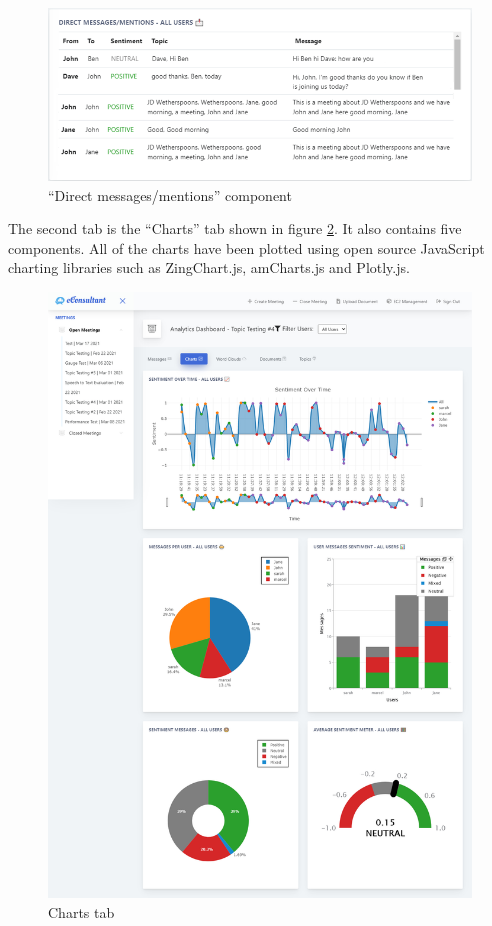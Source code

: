 \documentclass{article}
\begin{document}
\begin{figure}[H]
  \centering
  \includegraphics[scale=0.7]{charts/mentions.png}
  \caption{``Direct messages/mentions'' component}
  \label{fig:mentions}
\end{figure}

{\large 
The second tab is the ``Charts'' tab shown in figure \ref{fig:charts}. It also contains five components. All of the charts have been plotted using open source JavaScript charting libraries such as ZingChart.js, amCharts.js and Plotly.js.\par
}

\begin{figure}[H]
  \centering
  \includegraphics[scale=0.29]{implementation/charts.jpg}
  \caption{Charts tab}
  \label{fig:charts}
\end{figure}
\end{document}
